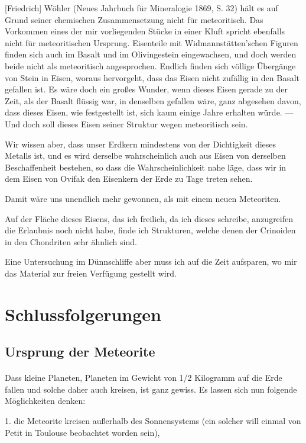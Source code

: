\documentclass[a4paper, 12pt, oneside]{article}
\begin{document}
[Friedrich] Wöhler (Neues Jahrbuch für Mineralogie 1869, S. 32) hält es auf Grund seiner chemischen Zusammensetzung nicht für meteoritisch. Das Vorkommen eines der mir vorliegenden Stücke in einer Kluft spricht ebenfalls nicht für meteoritischen Ursprung. Eisenteile mit Widmannstätten'schen Figuren finden sich auch im Basalt und im Olivingestein eingewachsen, und doch werden beide nicht als meteoritisch angesprochen. Endlich finden sich völlige Übergänge von Stein in Eisen, woraus hervorgeht, dass das Eisen nicht zufällig in den Basalt gefallen ist. Es wäre doch ein großes Wunder, wenn dieses Eisen gerade zu der Zeit, als der Basalt flüssig war, in denselben gefallen wäre, ganz abgesehen davon, dass dieses Eisen, wie festgestellt ist, sich kaum einige Jahre erhalten würde. — Und doch soll dieses Eisen seiner Struktur wegen meteoritisch sein.

Wir wissen aber, dass unser Erdkern mindestens von der Dichtigkeit dieses Metalls ist, und es wird derselbe wahrscheinlich auch aus Eisen von derselben Beschaffenheit bestehen, so dass die Wahrscheinlichkeit nahe läge, dass wir in dem Eisen von Ovifak den Eisenkern der Erde zu Tage treten sehen.

Damit wäre uns unendlich mehr gewonnen, als mit einem neuen Meteoriten.

Auf der Fläche dieses Eisens, das ich freilich, da ich dieses schreibe, anzugreifen die Erlaubnis noch nicht habe, finde ich Strukturen, welche denen der Crinoiden in den Chondriten sehr ähnlich sind.

Eine Untersuchung im Dünnschliffe aber muss ich auf die Zeit aufsparen, wo mir das Material zur freien Verfügung gestellt wird.
\clearpage
\section{Schlussfolgerungen}
\subsection{Ursprung der Meteorite}
\paragraph{}
Dass kleine Planeten, Planeten im Gewicht von 1/2 Kilogramm auf die Erde fallen und solche daher auch kreisen, ist ganz gewiss. Es lassen sich nun folgende Möglichkeiten denken:

1. die Meteorite kreisen außerhalb des Sonnensystems (ein solcher will einmal von Petit in Toulouse beobachtet worden sein),
\end{document}
